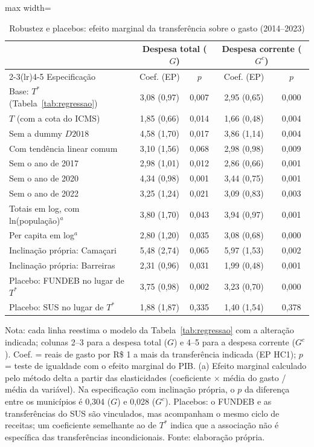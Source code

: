\begin{table}[H]
\centering\footnotesize
\setlength{\tabcolsep}{4pt}
\caption{Robustez e placebos: efeito marginal da transferência sobre o gasto (2014--2023)}
\label{tab:robustez}
\begin{adjustbox}{max width=\textwidth}
\begin{tabular}{lcccc}
\toprule
 & \multicolumn{2}{c}{Despesa total ($G$)} & \multicolumn{2}{c}{Despesa corrente ($G^{c}$)} \\
\cmidrule(lr){2-3}\cmidrule(lr){4-5}
Especificação & Coef. (EP) & $p$ & Coef. (EP) & $p$ \\
\midrule
Base: $T^{*}$ (Tabela~\ref{tab:regressao}) & 3,08 (0,97) & 0,007 & 2,95 (0,65) & 0,000 \\
$T$ (com a cota do ICMS) & 1,85 (0,66) & 0,014 & 1,66 (0,48) & 0,004 \\
Sem a dummy $D2018$ & 4,58 (1,70) & 0,017 & 3,86 (1,14) & 0,004 \\
Com tendência linear comum & 3,10 (1,56) & 0,068 & 2,98 (0,98) & 0,009 \\
Sem o ano de 2017 & 2,98 (1,01) & 0,012 & 2,86 (0,66) & 0,001 \\
Sem o ano de 2020 & 4,34 (0,98) & 0,001 & 3,44 (0,75) & 0,001 \\
Sem o ano de 2022 & 3,25 (1,24) & 0,021 & 3,09 (0,83) & 0,003 \\
Totais em log, com ln(população)$^{a}$ & 3,80 (1,70) & 0,043 & 3,94 (0,97) & 0,001 \\
Per capita em log$^{a}$ & 2,80 (1,20) & 0,035 & 3,08 (0,68) & 0,000 \\
Inclinação própria: Camaçari & 5,48 (2,74) & 0,065 & 5,97 (1,53) & 0,002 \\
Inclinação própria: Barreiras & 2,31 (0,96) & 0,031 & 1,99 (0,48) & 0,001 \\
\midrule
Placebo: FUNDEB no lugar de $T^{*}$ & 3,75 (0,98) & 0,002 & 3,23 (0,70) & 0,000 \\
Placebo: SUS no lugar de $T^{*}$ & 1,88 (1,87) & 0,335 & 1,40 (1,54) & 0,378 \\
\bottomrule
\end{tabular}
\end{adjustbox}
\par\vspace{3pt}\parbox{\textwidth}{\scriptsize Nota: cada linha reestima o modelo da Tabela~\ref{tab:regressao} com a alteração indicada; colunas 2--3 para a despesa total ($G$) e 4--5 para a despesa corrente ($G^{c}$). Coef. = reais de gasto por R\$ 1 a mais da transferência indicada (EP HC1); $p$ = teste de igualdade com o efeito marginal do PIB. (a) Efeito marginal calculado pelo método delta a partir das elasticidades (coeficiente $\times$ média do gasto / média da variável). Na especificação com inclinação própria, o $p$ da diferença entre os municípios é 0,304 ($G$) e 0,028 ($G^{c}$). Placebos: o FUNDEB e as transferências do SUS são vinculados, mas acompanham o mesmo ciclo de receitas; um coeficiente semelhante ao de $T^{*}$ indica que a associação não é específica das transferências incondicionais. Fonte: elaboração própria.}
\end{table}

